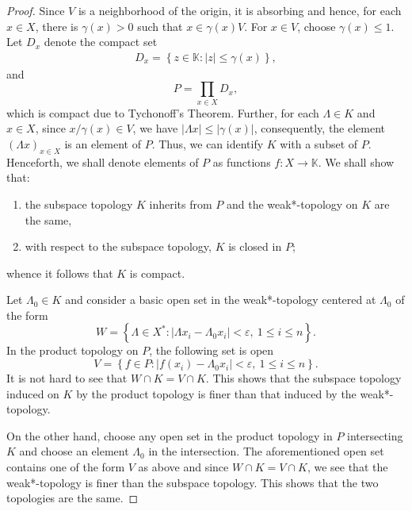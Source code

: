 \documentclass[11pt]{article}
\theoremstyle{thmstyle}
\theoremstyle{defstyle}
\newcommand{\R}{\mathbb{R}}
\newcommand{\bbC}{\mathbb{C}}
\newcommand{\K}{\mathbb{K}} %
\renewcommand{\le}{\leqslant}
\begin{document}
\begin{proof}
    Since $V$ is a neighborhood of the origin, it is absorbing and hence, for each $x\in X$, there is $\gamma(x) > 0$ such that $x\in\gamma(x) V$. For $x\in V$, choose $\gamma(x)\le 1$. Let $D_x$ denote the compact set 
    \begin{align}
        D_x = \left\{z\in\K\colon |z|\le \gamma(x)\right\},
    \end{align}
    and 
    \begin{equation*}
        P = \prod_{x\in X}D_x,
    \end{equation*}
    which is compact due to Tychonoff's Theorem. Further, for each $\Lambda\in K$ and $x\in X$, since $x/\gamma(x)\in V$, we have $|\Lambda x|\le |\gamma(x)|$, consequently, the element $(\Lambda x)_{x\in X}$ is an element of $P$. Thus, we can identify $K$ with a subset of $P$. Henceforth, we shall denote elements of $P$ as functions $f: X\to\K$. We shall show that:
    \begin{enumerate}[label=(\roman*)]
        \item the subspace topology $K$ inherits from $P$ and the weak*-topology on $K$ are the same,
        \item with respect to the subspace topology, $K$ is closed in $P$;
    \end{enumerate}
    whence it follows that $K$ is compact.

    Let $\Lambda_0\in K$ and consider a basic open set in the weak*-topology centered at $\Lambda_0$ of the form 
    \begin{equation*}
        W = \left\{\Lambda\in X^\ast\colon |\Lambda x_i - \Lambda_0 x_i| < \varepsilon,~1\le i\le n\right\}.
    \end{equation*}
    In the product topology on $P$, the following set is open 
    \begin{equation*}
        V = \left\{f\in P\colon |f(x_i) - \Lambda_0 x_i| < \varepsilon,~1\le i\le n\right\}.
    \end{equation*}
    It is not hard to see that $W\cap K = V\cap K$. This shows that the subspace topology induced on $K$ by the product topology is finer than that induced by the weak*-topology.

    On the other hand, choose any open set in the product topology in $P$ intersecting $K$ and choose an element $\Lambda_0$ in the intersection. The aforementioned open set contains one of the form $V$ as above and since $W\cap K = V\cap K$, we see that the weak*-topology is finer than the subspace topology. This shows that the two topologies are the same.


\end{proof}
\end{document}
